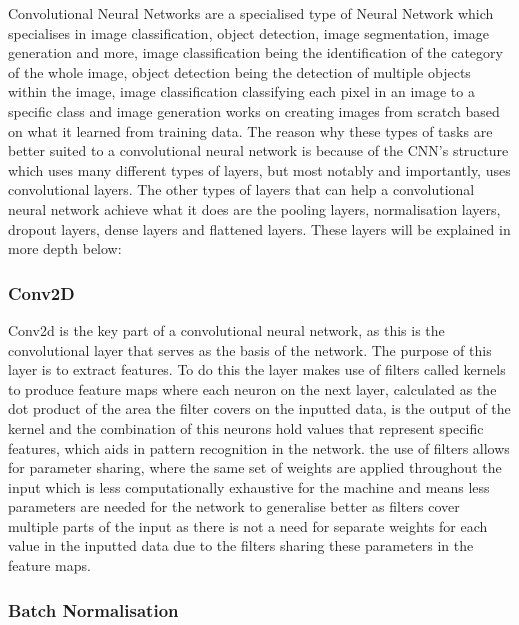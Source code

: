 \documentclass[]{final_report}
\begin{document}
Convolutional Neural Networks are a specialised type of Neural Network which specialises in image classification, object detection, image segmentation, image generation and more, image classification being the identification of the category of the whole image, object detection being the detection of multiple objects within the image, image classification classifying each pixel in an image to a specific class and image generation works on creating images from scratch based on what it learned from training data. The reason why these types of tasks are better suited to a convolutional neural network is because of the CNN’s structure which uses many different types of layers, but most notably and importantly, uses convolutional layers. The other types of layers that can help a convolutional neural network achieve what it does are the pooling layers, normalisation layers, dropout layers, dense layers and flattened layers. These layers will be explained in more depth below: 

\subsubsection{Conv2D}

Conv2d is the key part of a convolutional neural network, as this is the convolutional layer that serves as the basis of the network. The purpose of this layer is to extract features. To do this the layer makes use of filters called kernels to produce feature maps where each neuron on the next layer, calculated as the dot product of the area the filter covers on the inputted data,  is the output of the kernel and the combination of this neurons hold values that represent specific features, which aids in pattern recognition in the network. the use of filters allows for parameter sharing, where the same set of weights are applied throughout the input which is less computationally exhaustive for the machine and means less parameters are needed for the network to generalise better as filters cover multiple parts of the input as there is not a need for separate weights for each value in the inputted data due to the filters sharing these parameters in the feature maps.\cite{UpGrad2025}

\subsubsection{Batch Normalisation}
\end{document}
